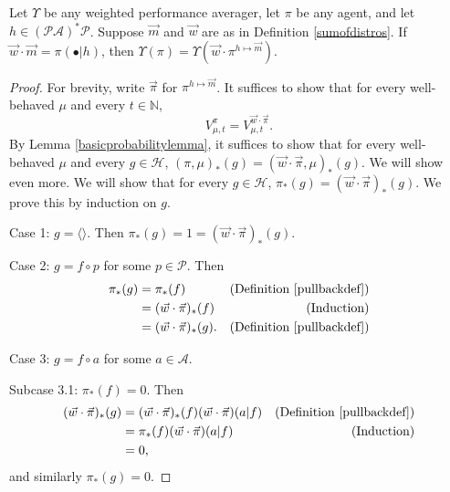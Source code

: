 \documentclass[runningheads]{llncs}
\begin{document}
\begin{proposition}
\label{longproposition}
    Let $\Upsilon$ be any weighted performance averager, let $\pi$ be any agent,
    and let $h\in(\mathcal P\mathcal A)^*\mathcal P$.
    Suppose $\vec m$ and $\vec w$ are as in Definition \ref{sumofdistros}.
    If $\vec w\cdot\vec m = \pi(\bullet|h)$, then
    $
        \Upsilon(\pi)
        =
        \Upsilon(\vec w\cdot \pi^{h\mapsto \vec m}).
    $
\end{proposition}

\begin{proof}
    For brevity, write $\vec\pi$ for $\pi^{h\mapsto \vec m}$. It suffices to
    show that for every well-behaved $\mu$ and every $t\in\mathbb N$,
    \[
        V^{\pi}_{\mu,t}
        =
        V^{\vec w\cdot \vec\pi}_{\mu,t}.
    \]
    By Lemma \ref{basicprobabilitylemma}, it suffices to show that for every
    well-behaved $\mu$ and every $g\in\mathcal H$,
    $
    (\pi,\mu)_*(g)
    =
    (\vec w\cdot\vec\pi,\mu)_*(g)
    $.
    We will show even more. We will show that for every $g\in\mathcal H$,
    $\pi_*(g)=(\vec w\cdot\vec\pi)_*(g)$.
    We prove this by induction on $g$.

    Case 1: $g=\langle\rangle$.
    Then $\pi_*(g)=1
    =(\vec w\cdot\vec\pi)_*(g)$.

    Case 2: $g=f\circ p$ for some $p\in\mathcal P$.
    Then
    \begin{align*}
        \pi_*(g)
            &= \pi_*(f)
                &\mbox{(Definition \ref{pullbackdef})}\\
            &= (\vec w\cdot\vec\pi)_*(f)
                &\mbox{(Induction)}\\
            &= (\vec w\cdot\vec\pi)_*(g).
                &\mbox{(Definition \ref{pullbackdef})}
    \end{align*}

    Case 3: $g=f\circ a$ for some $a\in\mathcal A$.

    Subcase 3.1: $\pi_*(f)=0$.
    Then
    \begin{align*}
        (\vec w\cdot\vec\pi)_*(g)
            &= (\vec w\cdot\vec\pi)_*(f)
            (\vec w\cdot\vec\pi)(a|f)
                &\mbox{(Definition \ref{pullbackdef})}\\
            &= \pi_*(f)(\vec w\cdot\vec\pi)(a|f)
                &\mbox{(Induction)}\\
            &= 0,
    \end{align*}
    and similarly $\pi_*(g)=0$.


\end{proof}
\end{document}
